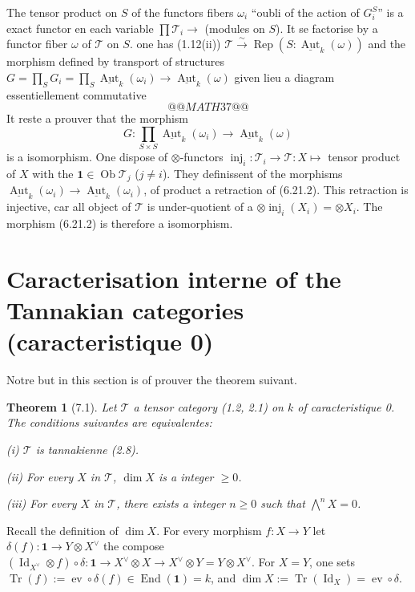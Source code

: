 \documentclass[12pt,a4paper]{article}
\theoremstyle{plain}
\newtheorem{theorem}{Theorem}[section]
\theoremstyle{definition}
\DeclareMathOperator{\End}{End}
\DeclareMathOperator{\Aut}{Aut}
\DeclareMathOperator{\Rep}{Rep}
\DeclareMathOperator{\Id}{Id}
\DeclareMathOperator{\ev}{ev}
\DeclareMathOperator{\inj}{inj}
\DeclareMathOperator{\Ob}{Ob}
\DeclareMathOperator{\Tr}{Tr}
\begin{document}
The tensor product on $S$ of the functors fibers $\omega_i$ ``oubli of the action of $G_i^S$'' is a exact functor en each variable $\prod \mathcal{T}_i \to$ (modules on $S$). It se factorise by a functor fiber $\omega$ of $\mathcal{T}$ on $S$. one has (1.12(ii)) $\mathcal{T} \xrightarrow{\sim} \Rep(S : \underline{\Aut}_k(\omega))$ and the morphism defined by transport of structures $G = \prod_S G_i = \prod_S \underline{\Aut}_k(\omega_i) \to \underline{\Aut}_k(\omega)$ given lieu a diagram essentiellement commutative
\[
@@MATH37@@
\]
It reste a prouver that the morphism
\begin{equation}\label{eq:6.21.2}
G : \prod_{S \times S} \underline{\Aut}_k(\omega_i) \to \underline{\Aut}_k(\omega)
\end{equation}
is a isomorphism. One dispose of $\otimes$-functors $\inj_i : \mathcal{T}_i \to \mathcal{T} : X \mapsto$ tensor product of $X$ with the $\mathbf{1} \in \Ob\mathcal{T}_j$ ($j \neq i$). They definissent of the morphisms $\underline{\Aut}_k(\omega_i) \to \underline{\Aut}_k(\omega_i)$, of product a retraction of (6.21.2). This retraction is injective, car all object of $\mathcal{T}$ is under-quotient of a $\otimes \inj_i(X_i) = \otimes X_i$. The morphism (6.21.2) is therefore a isomorphism.

\section{Caracterisation interne of the Tannakian categories (caracteristique 0)}

Notre but in this section is of prouver the theorem suivant.

\begin{theorem}[7.1]\label{thm:7.1}
Let $\mathcal{T}$ a tensor category (1.2, 2.1) on $k$ of caracteristique 0. The conditions suivantes are equivalentes:

\textup{(i)} $\mathcal{T}$ is tannakienne (2.8).

\textup{(ii)} For every $X$ in $\mathcal{T}$, $\dim X$ is a integer $\geq 0$.

\textup{(iii)} For every $X$ in $\mathcal{T}$, there exists a integer $n \geq 0$ such that $\bigwedge^n X = 0$.
\end{theorem}

Recall the definition of $\dim X$. For every morphism $f : X \to Y$ let $\delta(f) : \mathbf{1} \to Y \otimes X^\vee$ the compose $(\Id_{X^\vee} \otimes f) \circ \delta : \mathbf{1} \to X^\vee \otimes X \to X^\vee \otimes Y = Y \otimes X^\vee$. For $X = Y$, one sets $\Tr(f) := \ev \circ \delta(f) \in \End(\mathbf{1}) = k$, and $\dim X := \Tr(\Id_X) = \ev \circ \delta$.
\end{document}
